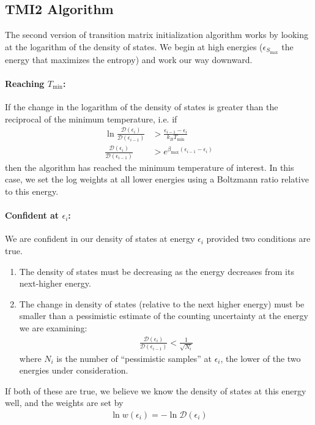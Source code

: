 \documentclass[letterpaper,twocolumn,amsmath,amssymb,pre,aps,10pt]{revtex4-1}
\begin{document}
\subsection{TMI2 Algorithm}

The second version of transition matrix initialization algorithm works
by looking at the logarithm of the density of states.  We begin at
high energies ($\epsilon_{S_{\max}}$ the energy that maximizes the entropy) and work our way
downward.

\paragraph{Reaching $T_{\min}$:}
If the change in the logarithm of the density of states is greater
than the reciprocal of the minimum temperature, i.e. if
\begin{align}
  \ln\frac{\mathcal D(\epsilon_i)}{\mathcal D(\epsilon_{i-1})} &>
  \frac{\epsilon_{i-1} - \epsilon_i}{k_BT_{\min}}
  \\
  \frac{\mathcal D(\epsilon_i)}{\mathcal D(\epsilon_{i-1})} &>
  e^{\beta_{\max}(\epsilon_{i-1} - \epsilon_i)}
\end{align}
then the algorithm has reached the minimum temperature of interest.
In this case, we set the log weights at all lower energies using a
Boltzmann ratio relative to this energy.
\paragraph{Confident at $\epsilon_i$:} We are confident in our density
of states at energy $\epsilon_i$ provided two conditions are true.
\begin{enumerate}
\item The density of states must be decreasing as the energy decreases
  from its next-higher energy.
\item The change in density of states (relative to the next higher
  energy) must be smaller than a pessimistic estimate of the counting
  uncertainty at the energy we are examining:
  \begin{align}
    \frac{\mathcal D(\epsilon_i)}{\mathcal D(\epsilon_{i-1})} < \frac1{\sqrt{N_i}}
  \end{align}
  where $N_i$ is the number of ``pessimistic
  samples'' at $\epsilon_i$, the lower of the two energies under
  consideration.
\end{enumerate}
If both of these are true, we believe we know the density of states at
this energy well, and the weights are set by
\begin{align}
  \ln w(\epsilon_i) = -\ln\mathcal{D}(\epsilon_i)
\end{align}
\end{document}
